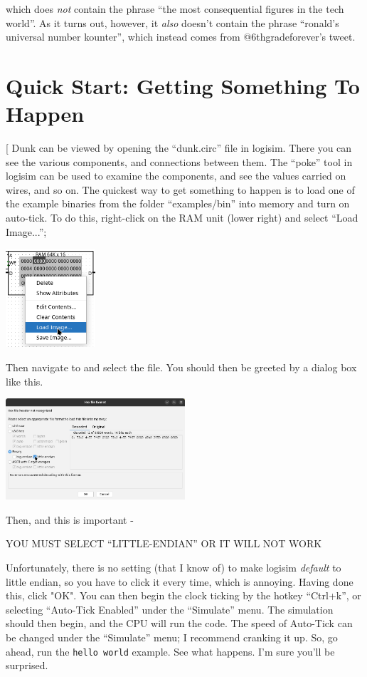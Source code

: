 \documentclass{article}
\begin{document}
which does \textit{not} contain the phrase ``the most consequential figures in the tech world''. As it turns out, however, it \textit{also} doesn't contain the phrase ``ronald's universal number kounter'', which instead comes from @6thgradeforever's tweet.

\section{Quick Start: Getting Something To Happen}
[
Dunk can be viewed by opening the ``dunk.circ'' file in logisim. There you can see the various components, and connections between them. The ``poke'' tool in logisim can be used to examine the components, and see the values carried on wires, and so on. The quickest way to get something to happen is to load one of the example binaries from the folder ``examples/bin'' into memory and turn on auto-tick. To do this, right-click on the RAM unit (lower right) and select ``Load Image...'';

    \begin{center}\includegraphics[width=0.25\textwidth]{images/load_image.png}\end{center}

Then navigate to and select the file. You should then be greeted by a dialog box like this.

    \begin{center}\includegraphics[width=0.5\textwidth]{images/little_endian.png}\end{center}

Then, and this is important -
    \begin{center}{\color{red} YOU MUST SELECT ``LITTLE-ENDIAN'' OR IT WILL NOT WORK}\end{center}
Unfortunately, there is no setting (that I know of) to make logisim \textit{default} to little endian, so you have to click it every time, which is annoying. Having done this, click "OK". You can then begin the clock ticking by the hotkey ``Ctrl+k'', or selecting ``Auto-Tick Enabled'' under the ``Simulate'' menu. The simulation should then begin, and the CPU will run the code. The speed of Auto-Tick can be changed under the ``Simulate'' menu; I recommend cranking it up. So, go ahead, run the \Verb|hello world| example. See what happens. I'm sure you'll be surprised.
\end{document}
